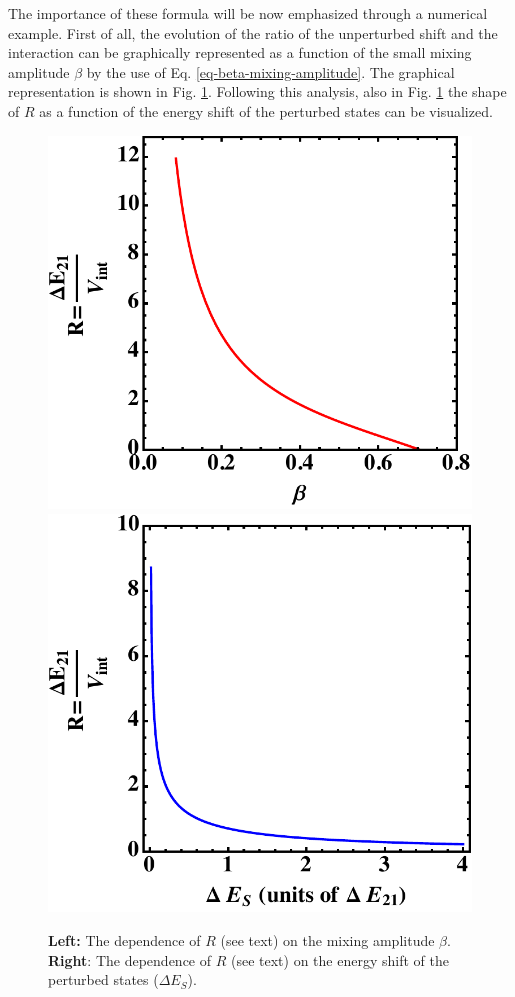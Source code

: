 The importance of these formula will be now emphasized through a numerical example. First of all, the evolution of the ratio of the unperturbed shift and the interaction can be graphically represented as a function of the small mixing amplitude $\beta$ by the use of Eq. \ref{eq-beta-mixing-amplitude}. The graphical representation is shown in Fig. \ref{fig-beta-mixing-amplitude}. Following this analysis, also in Fig. \ref{fig-beta-mixing-amplitude} the shape of $R$ as a function of the energy shift of the perturbed states can be visualized.

\begin{figure}
    \centering
    \includegraphics[scale=0.5]{Chapters/Figures/beta_mixing_amplitude.pdf}
    \includegraphics[scale=0.5]{Chapters/Figures/energy_shift_mixing_shape.pdf}
    \caption{\textbf{Left:} The dependence of $R$ (see text) on the mixing amplitude $\beta$. \textbf{Right}: The dependence of $R$ (see text) on the energy shift of the perturbed states ($\Delta E_S$).}
    \label{fig-beta-mixing-amplitude}
\end{figure}

